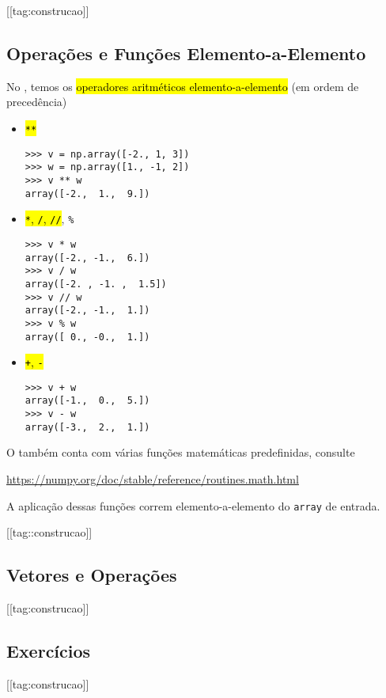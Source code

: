 [[tag:construcao]]

\subsection{Operações e Funções Elemento-a-Elemento}

No {\numpy}, temos os \hl{operadores aritméticos elemento-a-elemento} (em ordem de precedência)
\begin{itemize}
\item \hl{{\lstinline!**!}}
\begin{lstlisting}
>>> v = np.array([-2., 1, 3])
>>> w = np.array([1., -1, 2])
>>> v ** w
array([-2.,  1.,  9.])
\end{lstlisting}
\item \hl{{\lstinline!*!}, {\lstinline!/!}, {\lstinline!//!}}, \lstinline!%!
\begin{lstlisting}
>>> v * w
array([-2., -1.,  6.])
>>> v / w
array([-2. , -1. ,  1.5])
>>> v // w
array([-2., -1.,  1.])
>>> v % w
array([ 0., -0.,  1.])
\end{lstlisting}
\item \hl{{\lstinline!+!}, {\lstinline!-!}}
\begin{lstlisting}
>>> v + w
array([-1.,  0.,  5.])
>>> v - w
array([-3.,  2.,  1.])
\end{lstlisting}
\end{itemize}

O {\numpy} também conta com várias funções matemáticas predefinidas, consulte
\begin{center}
  \url{https://numpy.org/doc/stable/reference/routines.math.html}
\end{center}
A aplicação dessas funções correm elemento-a-elemento do \lstinline+array+ de entrada.

\begin{ex}
  
  [[tag::construcao]]

\end{ex}

\subsection{Vetores e Operações}

[[tag:construcao]]

\subsection{Exercícios}

[[tag:construcao]]